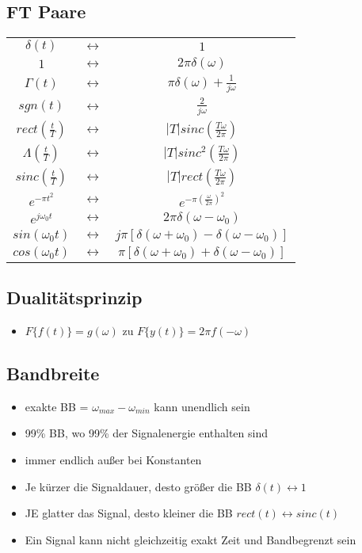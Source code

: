 \documentclass{article}
\begin{document}
\subsection{FT Paare}
\begin{tabular}{ ccc}
$\delta(t)$ & $\leftrightarrow$ & $1$\\
$1$ & $\leftrightarrow$ & $2\pi\delta(\omega)$\\
$\Gamma(t)$ & $\leftrightarrow$ & $\pi\delta(\omega)+\frac{1}{j\omega}$\\
$sgn(t)$ & $\leftrightarrow$ & $\frac{2}{j\omega}$\\
$rect(\frac{t}{T})$ & $\leftrightarrow$ & $|T|sinc(\frac{T\omega}{2\pi})$\\
$\Lambda(\frac{t}{T})$ & $\leftrightarrow$ & $|T|sinc^2(\frac{T\omega}{2\pi})$\\
$sinc(\frac{t}{T})$ & $\leftrightarrow$ & $|T|rect(\frac{T\omega}{2\pi})$\\
$e^{-\pi t^2}$ & $\leftrightarrow$ & $e^{-\pi(\frac{\omega}{2\pi})^2}$\\
$e^{j\omega_0t}$ & $\leftrightarrow$ & $2\pi\delta(\omega-\omega_0)$\\
$sin(\omega_0 t)$ & $\leftrightarrow$ & $j\pi[\delta(\omega+\omega_0)-\delta(\omega-\omega_0)]$\\
$cos(\omega_0t)$ & $\leftrightarrow$ & $\pi[\delta(\omega+\omega_0)+\delta(\omega-\omega_0)]$\\

\end{tabular}

\subsection{Dualitätsprinzip}
\begin{itemize}
\item $F\{f(t)\} = g(\omega)$ zu $F\{y(t)\} = 2\pi f(-\omega)$
\end{itemize}

\subsection{Bandbreite}
\begin{itemize}
\item exakte BB = $\omega_{max}-\omega_{min}$ kann unendlich sein
\item 99\% BB, wo 99\% der Signalenergie enthalten sind
\item immer endlich au\ss er bei Konstanten
\item Je kürzer die Signaldauer, desto grö\ss er die BB $\delta(t) \leftrightarrow 1$
\item JE glatter das Signal, desto kleiner die BB $rect(t) \leftrightarrow sinc(t)$
\item Ein Signal kann nicht gleichzeitig exakt Zeit und Bandbegrenzt sein
\end{itemize}
\end{document}
